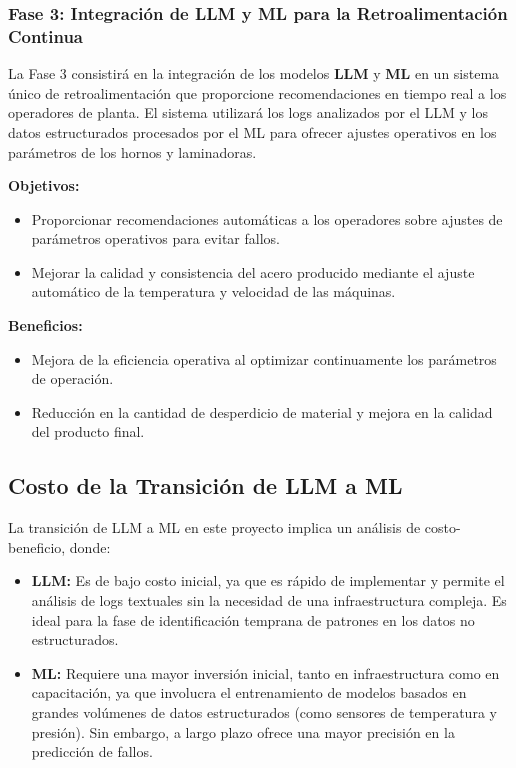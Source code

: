 \subsubsection{Fase 3: Integración de LLM y ML para la Retroalimentación Continua}

La Fase 3 consistirá en la integración de los modelos \textbf{LLM} y \textbf{ML} en un sistema único de retroalimentación que proporcione recomendaciones en tiempo real a los operadores de planta. El sistema utilizará los logs analizados por el LLM y los datos estructurados procesados por el ML para ofrecer ajustes operativos en los parámetros de los hornos y laminadoras.

\textbf{Objetivos:}
\begin{itemize}
    \item Proporcionar recomendaciones automáticas a los operadores sobre ajustes de parámetros operativos para evitar fallos.
    \item Mejorar la calidad y consistencia del acero producido mediante el ajuste automático de la temperatura y velocidad de las máquinas.
\end{itemize}

\textbf{Beneficios:}
\begin{itemize}
    \item Mejora de la eficiencia operativa al optimizar continuamente los parámetros de operación.
    \item Reducción en la cantidad de desperdicio de material y mejora en la calidad del producto final.
\end{itemize}

\subsection{Costo de la Transición de LLM a ML}

La transición de LLM a ML en este proyecto implica un análisis de costo-beneficio, donde:

\begin{itemize}
    \item \textbf{LLM:} Es de bajo costo inicial, ya que es rápido de implementar y permite el análisis de logs textuales sin la necesidad de una infraestructura compleja. Es ideal para la fase de identificación temprana de patrones en los datos no estructurados.
    \item \textbf{ML:} Requiere una mayor inversión inicial, tanto en infraestructura como en capacitación, ya que involucra el entrenamiento de modelos basados en grandes volúmenes de datos estructurados (como sensores de temperatura y presión). Sin embargo, a largo plazo ofrece una mayor precisión en la predicción de fallos.
\end{itemize}



